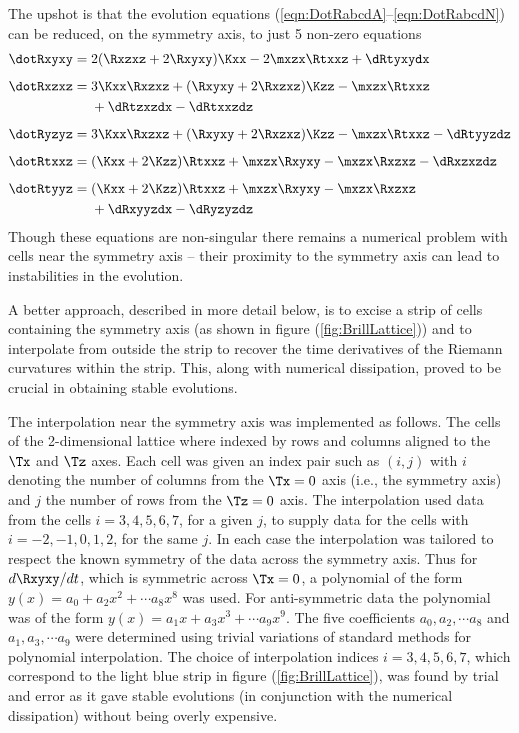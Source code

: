 \documentclass[a4paper,12pt]{article}
\numberwithin{equation}{section}
\begin{document}
The upshot is that the evolution equations (\ref{eqn:DotRabcdA}--\ref{eqn:DotRabcdN}) can be
reduced, on the symmetry axis, to just 5 non-zero equations
\begin{align}
   \label{eqn:BrillSymmAxisA}
   \dotRxyxy ={}
   &
     2(\Rxzxz+2\Rxyxy)\Kxx
   - 2\mxzx\Rtxxz
   + \dRtyxydx
   \\[5pt]
   \label{eqn:BrillSymmAxisB}
   \dotRxzxz ={}
   &
     3\Kxx\Rxzxz
   + (\Rxyxy+2\Rxzxz)\Kzz
   - \mxzx\Rtxxz
   \notag\\
   &
   + \dRtzxzdx
   - \dRtxxzdz
   \\[5pt]
   \label{eqn:BrillSymmAxisC}
   \dotRyzyz ={}
   &
     3\Kxx\Rxzxz
   + (\Rxyxy+2\Rxzxz)\Kzz
   - \mxzx\Rtxxz
   - \dRtyyzdz
   \\[5pt]
   \label{eqn:BrillSymmAxisD}
   \dotRtxxz ={}
   &
    (\Kxx+2\Kzz)\Rtxxz
   + \mxzx\Rxyxy
   - \mxzx\Rxzxz
   - \dRxzxzdz
   \\[5pt]
   \label{eqn:BrillSymmAxisE}
   \dotRtyyz ={}
   &
    (\Kxx+2\Kzz)\Rtxxz
   + \mxzx\Rxyxy
   - \mxzx\Rxzxz
   \notag\\
   &
   + \dRxyyzdx
   - \dRyzyzdz
\end{align}
Though these equations are non-singular there remains a numerical problem with cells near
the symmetry axis -- their proximity to the symmetry axis can lead to instabilities in the
evolution.

A better approach, described in more detail below, is to excise a strip of cells containing
the symmetry axis (as shown in figure (\ref{fig:BrillLattice})) and to interpolate from
outside the strip to recover the time derivatives of the Riemann curvatures within the strip.
This, along with numerical dissipation, proved to be crucial in obtaining stable evolutions.

The interpolation near the symmetry axis was implemented as follows. The cells of the
2-dimensional lattice where indexed by rows and columns aligned to the $\Tx$ and $\Tz$ axes.
Each cell was given an index pair such as $(i,j)$ with $i$ denoting the number of columns
from the $\Tx=0$ axis (i.e., the symmetry axis) and $j$ the number of rows from the $\Tz=0$
axis. The interpolation used data from the cells $i=3,4,5,6,7$, for a given $j$, to supply
data for the cells with $i=-2,-1,0,1,2$, for the same $j$. In each case the interpolation was
tailored to respect the known symmetry of the data across the symmetry axis. Thus for
$d\Rxyxy/dt$, which is symmetric across $\Tx=0$, a polynomial of the form $y(x) = a_0 + a_2
x^2 + \cdots a_8 x^8$ was used. For anti-symmetric data the polynomial was of the form $y(x)
= a_1 x + a_3 x^3 + \cdots a_9 x^9$. The five coefficients $a_0,a_2,\cdots a_8$ and
$a_1,a_3,\cdots a_9$ were determined using trivial variations of standard methods for
polynomial interpolation. The choice of interpolation indices $i=3,4,5,6,7$, which correspond
to the light blue strip in figure (\ref{fig:BrillLattice}), was found by trial and error as
it gave stable evolutions (in conjunction with the numerical dissipation) without being overly
expensive.
\end{document}
